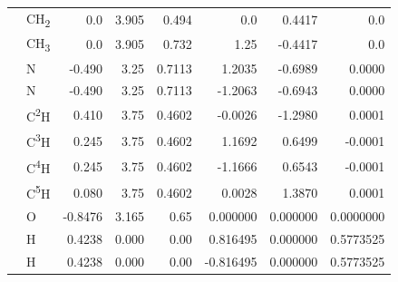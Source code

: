 \begin{table}[H]
\begin{centering}
\begin{tabular*}{1\linewidth}{@{\extracolsep{\fill}}llrrrrrr}
 & {\scriptsize{}CH\textsubscript{2}} & {\scriptsize{}0.0} & {\scriptsize{}3.905} & {\scriptsize{}0.494} & {\scriptsize{}0.0} & {\scriptsize{}0.4417} & {\scriptsize{}0.0}\tabularnewline
\addlinespace[-0.17em]
\addlinespace[-0.33em]
 & {\scriptsize{}CH\textsubscript{3}} & {\scriptsize{}0.0} & {\scriptsize{}3.905} & {\scriptsize{}0.732} & {\scriptsize{}1.25} & {\scriptsize{}-0.4417} & {\scriptsize{}0.0}\tabularnewline
\addlinespace[-0.17em]
\midrule 
\addlinespace[-0.33em]
{\scriptsize{}Pyrimidine \citep{jorgensen_relative_1990}} & {\scriptsize{}N} & {\scriptsize{}-0.490} & {\scriptsize{}3.25} & {\scriptsize{}0.7113} & {\scriptsize{}1.2035} & {\scriptsize{}-0.6989} & {\scriptsize{}0.0000}\tabularnewline
\addlinespace[-0.17em]
\addlinespace[-0.33em]
 & {\scriptsize{}N} & {\scriptsize{}-0.490} & {\scriptsize{}3.25} & {\scriptsize{}0.7113} & {\scriptsize{}-1.2063} & {\scriptsize{}-0.6943} & {\scriptsize{}0.0000}\tabularnewline
\addlinespace[-0.17em]
\addlinespace[-0.33em]
 & {\scriptsize{}C\textsuperscript{2}H} & {\scriptsize{}0.410} & {\scriptsize{}3.75} & {\scriptsize{}0.4602} & {\scriptsize{}-0.0026} & {\scriptsize{}-1.2980} & {\scriptsize{}0.0001}\tabularnewline
\addlinespace[-0.17em]
\addlinespace[-0.33em]
 & {\scriptsize{}C\textsuperscript{3}H} & {\scriptsize{}0.245} & {\scriptsize{}3.75} & {\scriptsize{}0.4602} & {\scriptsize{}1.1692} & {\scriptsize{}0.6499} & {\scriptsize{}-0.0001}\tabularnewline
\addlinespace[-0.17em]
\addlinespace[-0.33em]
 & {\scriptsize{}C\textsuperscript{4}H} & {\scriptsize{}0.245} & {\scriptsize{}3.75} & {\scriptsize{}0.4602} & {\scriptsize{}-1.1666} & {\scriptsize{}0.6543} & {\scriptsize{}-0.0001}\tabularnewline
\addlinespace[-0.17em]
\addlinespace[-0.33em]
 & {\scriptsize{}C\textsuperscript{5}H} & {\scriptsize{}0.080} & {\scriptsize{}3.75} & {\scriptsize{}0.4602} & {\scriptsize{}0.0028} & {\scriptsize{}1.3870} & {\scriptsize{}0.0001}\tabularnewline
\addlinespace[-0.17em]
\midrule 
\addlinespace[-0.33em]
{\scriptsize{}SPC/E \citep{SPC/E}} & {\scriptsize{}O} & {\scriptsize{}-0.8476} & {\scriptsize{}3.165} & {\scriptsize{}0.65} & {\scriptsize{}0.000000} & {\scriptsize{}0.000000} & {\scriptsize{}0.0000000}\tabularnewline
\addlinespace[-0.17em]
\addlinespace[-0.33em]
 & {\scriptsize{}H} & {\scriptsize{}0.4238} & {\scriptsize{}0.000} & {\scriptsize{}0.00} & {\scriptsize{}0.816495} & {\scriptsize{}0.000000} & {\scriptsize{}0.5773525}\tabularnewline
\addlinespace[-0.17em]
\addlinespace[-0.33em]
 & {\scriptsize{}H} & {\scriptsize{}0.4238} & {\scriptsize{}0.000} & {\scriptsize{}0.00} & {\scriptsize{}-0.816495} & {\scriptsize{}0.000000} & {\scriptsize{}0.5773525}\tabularnewline

\end{tabular*}
\end{centering}
\end{table}
